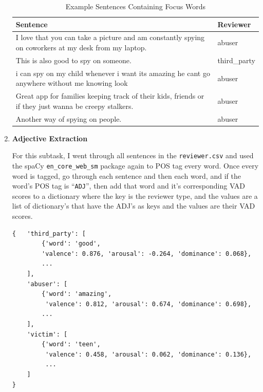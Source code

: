 \documentclass[12pt]{article}
\begin{document}
\begin{enumerate}
    \begin{table}[H]
        \centering
        \renewcommand{\arraystretch}{1.4}
        \begin{tabular}{p{10cm} p{3cm}}
            \toprule
            \rowcolor{tableheader}
            \color{white}\textbf{Sentence} & \color{white}\textbf{Reviewer} \\
            \midrule
            \rowcolor{rowalt} I love that you can take a picture and am constantly spying on coworkers at my desk from my laptop. & abuser \\
            This is also good to spy on someone. & third\_party \\
            \rowcolor{rowalt} i can spy on my child whenever i want its amazing he cant go anywhere without me knowing look & abuser \\
            Great app for families keeping track of their kids, friends or if they just wanna be creepy stalkers. & abuser \\
            \rowcolor{rowalt} Another way of spying on people. & abuser \\
            \bottomrule
        \end{tabular}
        \caption{Example Sentences Containing Focus Words}
        \label{tab:sentences}
    \end{table}

    \item \textbf{Adjective Extraction}
    
    For this subtask, I went through all sentences in the \texttt{reviewer.csv} and used the spaCy 
    \texttt{en\_core\_web\_sm} package again to POS tag every word. Once every word is tagged, go through each 
    sentence and then each word, and if the word's POS tag is ``\texttt{ADJ}'', then add that word and it's 
    corresponding VAD scores to a dictionary where the key is the reviewer type, and the 
    values are a list of dictionary's that have the ADJ's as keys and the values are their VAD scores.

\begin{lstlisting}
{   'third_party': [
        {'word': 'good', 
        'valence': 0.876, 'arousal': -0.264, 'dominance': 0.068},
        ...
    ],
    'abuser': [
        {'word': 'amazing',
         'valence': 0.812, 'arousal': 0.674, 'dominance': 0.698}, 
        ...
    ],
    'victim': [
        {'word': 'teen',
         'valence': 0.458, 'arousal': 0.062, 'dominance': 0.136}, 
         ...
    ]
}
\end{lstlisting}


\end{enumerate}
\end{document}
